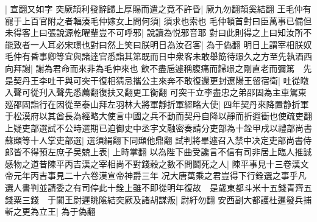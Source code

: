 |{
	宣翻又如字}
突厥頡利發辭歸上厚賜而遣之竟不許昏|{
	厥九勿翻頡奚結翻}
王毛仲有寵于上百官附之者輻湊毛仲嫁女上問何須|{
	須求也索也}
毛仲頓首對曰臣萬事已備但未得客上曰張說源乾曜輩豈不可呼邪|{
	說讀為悦邪音耶}
對曰此則得之上曰知汝所不能致者一人耳必宋璟也對曰然上笑曰朕明日為汝召客|{
	為于偽翻}
明日上謂宰相朕奴毛仲有昏事卿等宜與諸逹官悉詣其第既而日中衆客未敢舉筯待璟久之方至先執酒西向拜謝|{
	謝為君命而來非為毛仲來也}
飲不盡巵遽稱腹痛而歸璟之剛直老而彌篤　先是契丹王李吐干與可突干復相猜忌攜公主來奔不敢復還更封遼陽王留宿衛|{
	吐從暾入聲可從刋入聲先悉薦翻復扶又翻更工衡翻}
可突干立李盡忠之弟邵固為主車駕東廵邵固詣行在因從至泰山拜左羽林大將軍靜折軍經略大使|{
	四年契丹來降置静折軍于松漠府以其酋長為經略大使言中國之兵不動而契丹自降以靜而折遐衝也使疏吏翻}
上疑吏部選試不公時選期已迫御史中丞宇文融密奏請分吏部為十銓甲戌以禮部尚書蘇頲等十人掌吏部選|{
	選須絹翻下同頲他鼎翻}
試判將畢遽召入禁中决定吏部尚書侍郎皆不得預左庶子吴兢上表|{
	上時掌翻}
以為陛下曲受讒言不信有司非居上臨人推誠感物之道昔陳平丙吉漢之宰相尚不對錢穀之數不問鬬死之人|{
	陳平事見十三卷漢文帝元年丙吉事見二十六卷漢宣帝神爵三年}
况大唐萬乘之君豈得下行銓選之事乎凡選人書判並請委之有司停此十銓上雖不即從明年復故　是歲東都斗米十五錢青齊五錢粟三錢　于闐王尉遲眺隂結突厥及諸胡謀叛|{
	尉紆勿翻}
安西副大都護杜暹發兵捕斬之更為立王|{
	為于偽翻}


